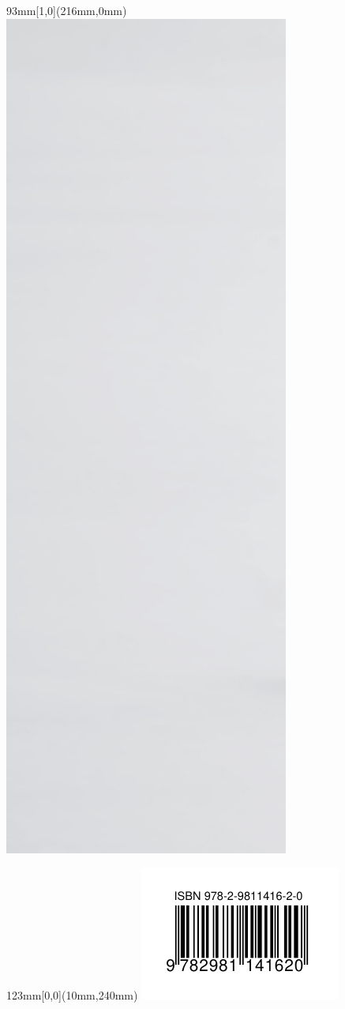 \documentclass[letterpaper,11pt]{memoir}
\begin{document}
\begin{textblock*}{93mm}[1,0](216mm,0mm)
  \includegraphics[height=11in,keepaspectratio=true]{harfang-arriere.jpg} \\
\end{textblock*}

\begin{textblock*}{123mm}[0,0](10mm,240mm)
  \includegraphics[keepaspectratio=true]{codebarre} \\
\end{textblock*}
\end{document}
